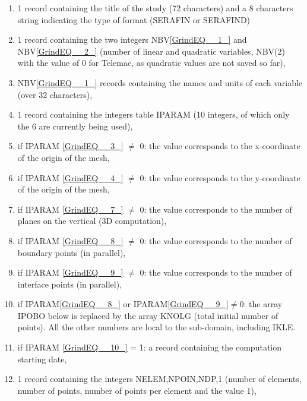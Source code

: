 \begin{enumerate}
\item  1 record containing the title of the study (72 characters) and a 8 characters string indicating the type of format (SERAFIN or SERAFIND)

\item  1 record containing the two integers NBV\eqref{GrindEQ__1_} and NBV\eqref{GrindEQ__2_} (number of linear and quadratic variables, NBV(2) with the value of 0 for Telemac, as quadratic values are not saved so far),

\item  NBV\eqref{GrindEQ__1_} records containing the names and units of each variable (over 32 characters),

\item  1 record containing the integers table IPARAM (10 integers, of which only the 6 are currently being used),

\item  if IPARAM \eqref{GrindEQ__3_} $\neq$ 0: the value corresponds to the x-coordinate of the origin of the mesh,

\item  if IPARAM \eqref{GrindEQ__4_} $\neq$ 0: the value corresponds to the y-coordinate of the origin of the mesh,

\item  if IPARAM \eqref{GrindEQ__7_} $\neq$ 0: the value corresponds to the number of  planes on the vertical (3D computation),

\item  if IPARAM \eqref{GrindEQ__8_} $\neq$ 0: the value corresponds to the number of boundary points (in parallel),

\item  if IPARAM \eqref{GrindEQ__9_} $\neq$ 0: the value corresponds to the number of interface points (in parallel),

\item  if IPARAM\eqref{GrindEQ__8_} or IPARAM\eqref{GrindEQ__9_}$\neq$0: the array IPOBO below is replaced by the array KNOLG (total initial number of points). All the other numbers are local to the sub-domain, including IKLE.

\item  if IPARAM \eqref{GrindEQ__10_} = 1: a record containing the computation starting date,

\item  1 record containing the integers NELEM,NPOIN,NDP,1 (number of elements, number of points, number of points per element and the value 1),


\end{enumerate}
